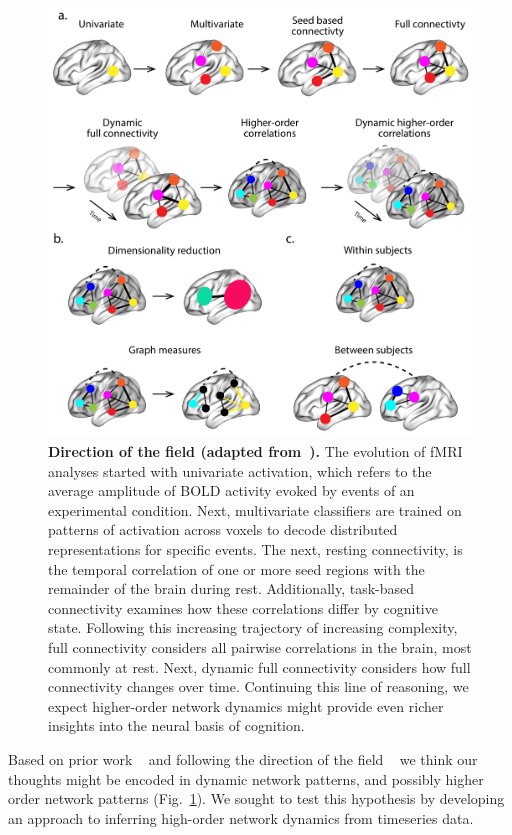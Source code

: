 \documentclass[english]{article}
\begin{document}
\begin{figure}
  \centering
  \includegraphics[width=\textwidth]{figs/direction_of_field.pdf}
  \caption{\textbf{Direction of the field (adapted from~\citep{Turk13}).} The evolution of fMRI analyses started with
    univariate activation, which refers to
    the average amplitude of BOLD activity evoked by events of an
    experimental condition. Next, multivariate classifiers are trained
    on patterns of activation across voxels to decode distributed
    representations for specific events. The next, resting
    connectivity, is the temporal correlation of one or more seed
    regions with the remainder of the brain during rest. Additionally,
    task-based connectivity examines how these correlations differ by
    cognitive state. Following this increasing trajectory of
    increasing complexity, full connectivity considers all pairwise
    correlations in the brain, most commonly at rest.  Next, dynamic
    full connectivity considers how full connectivity changes over
    time. Continuing this line of reasoning, we expect higher-order network dynamics might provide even richer insights into the neural basis of cognition.}
  \label{fig:direction_of_field}
\end{figure}



Based on prior work ~\citep{DemeEtal19} and following the direction of the field ~\citep{Turk13} we think our thoughts might be encoded in
dynamic network patterns, and possibly higher order network
patterns (Fig.~\ref{fig:direction_of_field}). We sought to test this hypothesis by developing an approach
to inferring high-order network dynamics from timeseries data. 
\end{document}
